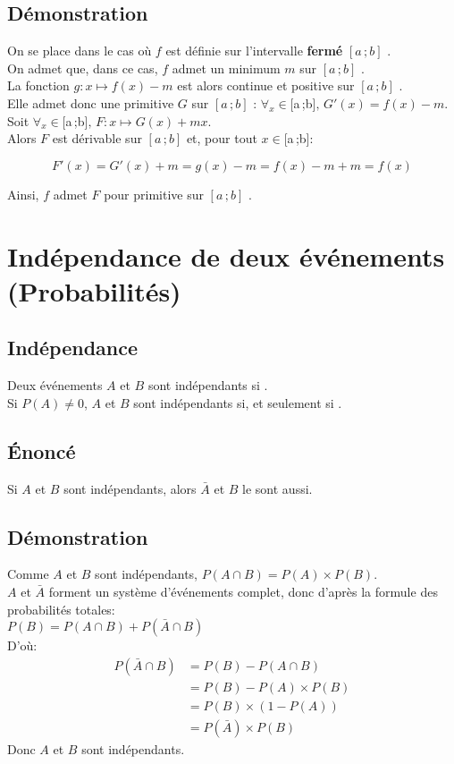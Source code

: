 \documentclass[12px]{article}
\newcommand\I{$[a\,;b]$ }
\begin{document}
	\subsection{Démonstration}
	On se place dans le cas où $f$ est définie sur l'intervalle \textbf{fermé} \I.\\
	On admet que, dans ce cas, $f$ admet un minimum $m$ sur \I.\\
	La fonction $g:x\mapsto f(x)-m$ est alors continue et positive sur \I.\\
	Elle admet donc une primitive $G$ sur \I : $\forall_{x} \in \I, \, G'(x) = f(x) -m$.\\
	Soit $\forall_{x} \in \I, \, F: x \mapsto G(x) + mx$.\\
	Alors $F$ est dérivable sur \I et, pour tout $x \in \I$:
	\begin{center}
		\begin{displaymath}
			F'(x) = G'(x) + m = g(x) - m = f(x) -m +m = f(x)
		\end{displaymath}
	\end{center}
	Ainsi, $f$ admet $F$ pour primitive sur \I.
	
	\section{Indépendance de deux événements (Probabilités)}
	
	\subsection{Indépendance}
	Deux événements $A$ et $B$ sont indépendants si .\\
	Si $P(A)\not=0$, $A$ et $B$ sont indépendants si, et seulement si .
	
	\subsection{\'Enoncé}
	Si $A$ et $B$ sont indépendants, alors $\bar{A}$ et $B$ le sont aussi.
	
	\subsection{Démonstration}
	Comme $A$ et $B$ sont indépendants, $P(A\cap B) = P(A)\times P(B)$.\\
	$A$ et $\bar{A}$ forment un système d'événements complet, donc d'après la formule des probabilités totales:\\
	$P(B)= P(A\cap B) + P(\bar{A} \cap B)$\\
	D'où:
	\begin{align}
	P(\bar{A}\cap B) &= P(B) - P(A\cap B)\\
	&= P(B) - P(A)\times P(B)\\
	&= P(B)\times (1-P(A))\\
	&= P(\bar{A})\times P(B)
	\end{align}
	Donc $A$ et $B$ sont indépendants.
	
\end{document}
